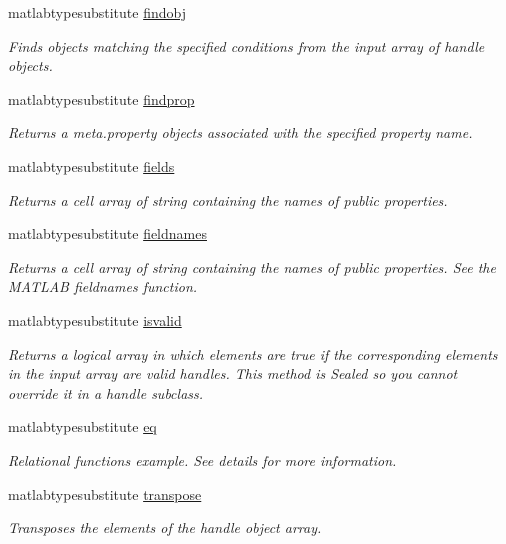 \begin{DoxyCompactItemize}
matlabtypesubstitute \hyperlink{classhandle_a000398ac90dd973b4618c739e6fd64a9}{findobj}
\begin{DoxyCompactList}\small\item\em Finds objects matching the specified conditions from the input array of handle objects. \end{DoxyCompactList}\item 
matlabtypesubstitute \hyperlink{classhandle_ab4b410e2df940296c9d2563898c951fe}{findprop}
\begin{DoxyCompactList}\small\item\em Returns a meta.\-property objects associated with the specified property name. \end{DoxyCompactList}\item 
matlabtypesubstitute \hyperlink{classhandle_ad9c0557345e68bd933889c28b2a9484b}{fields}
\begin{DoxyCompactList}\small\item\em Returns a cell array of string containing the names of public properties. \end{DoxyCompactList}\item 
matlabtypesubstitute \hyperlink{classhandle_a7086577f3953d4bd9ce17b07c4f6e141}{fieldnames}
\begin{DoxyCompactList}\small\item\em Returns a cell array of string containing the names of public properties. See the M\-A\-T\-L\-A\-B fieldnames function. \end{DoxyCompactList}\item 
matlabtypesubstitute \hyperlink{classhandle_a72617e83dc9643b61ed8af63e5058ccf}{isvalid}
\begin{DoxyCompactList}\small\item\em Returns a logical array in which elements are true if the corresponding elements in the input array are valid handles. This method is Sealed so you cannot override it in a handle subclass. \end{DoxyCompactList}\item 
matlabtypesubstitute \hyperlink{classhandle_a2fb018cd603a5ced1783bfb20c6cce86}{eq}
\begin{DoxyCompactList}\small\item\em Relational functions example. See details for more information. \end{DoxyCompactList}\item 
matlabtypesubstitute \hyperlink{classhandle_acd9b55f206750374c4dfca508cfff084}{transpose}
\begin{DoxyCompactList}\small\item\em Transposes the elements of the handle object array. \end{DoxyCompactList}\item 

\end{DoxyCompactItemize}
